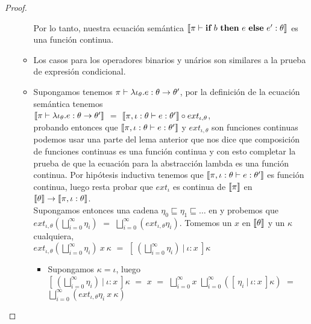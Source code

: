 \begin{proof}
\begin{itemize}
\begin{itemize}
Por lo tanto, nuestra ecuaci\'on sem\'antica $\llbracket \pi \vdash \textbf{if} \ b \ \textbf{then} \ e \ \textbf{else} \ e' : \theta \rrbracket$ es
una funci\'on continua.

\item Los casos para los operadores binarios y un\'arios son similares a la prueba
de expresi\'on condicional.

\item Supongamos tenemos $\pi \vdash \lambda \iota_{\theta} . e : \theta \rightarrow \theta'$, 
por la definici\'on de la ecuaci\'on sem\'antica tenemos \\

$\llbracket \pi \vdash \lambda \iota_{\theta} . e : \theta \rightarrow \theta' \rrbracket$ $=$
$\llbracket \pi,\iota:\theta \vdash e : \theta' \rrbracket \circ ext_{\iota,\theta}$, \\

probando entonces
que $\llbracket \pi,\iota:\theta \vdash e : \theta' \rrbracket$ y $ext_{\iota,\theta}$ son funciones 
continuas podemos usar una parte del lema anterior que nos dice que composici\'on
de funciones continuas es una funci\'on continua y con esto completar la prueba de que
la ecuaci\'on para la abstracci\'on lambda es una funci\'on continua. Por hip\'otesis
inductiva tenemos que $\llbracket \pi,\iota:\theta \vdash e : \theta' \rrbracket$ es funci\'on
continua, luego resta probar que $ext_\iota$ es continua de $\llbracket \pi \rrbracket$ en 
$\llbracket \theta \rrbracket \rightarrow \llbracket \pi,\iota:\theta \rrbracket$.\\

Supongamos entonces una cadena $\eta_0 \sqsubseteq \eta_1 \sqsubseteq \ldots$ en 
y probemos que $ext_{\iota,\theta} (\bigsqcup\limits^{\infty}_{i=0} \eta_i)$ $=$
$\bigsqcup\limits^{\infty}_{i=0} (ext_{\iota,\theta} \eta_i)$. Tomemos un $x$ en $\llbracket \theta \rrbracket$
y un $\kappa$ cualquiera,\\

$ext_{\iota,\theta} (\bigsqcup\limits^{\infty}_{i=0} \eta_i) \ x \ \kappa$ $=$
$[ \ (\bigsqcup\limits^{\infty}_{i=0} \eta_i) \ | \ \iota:x \ ] \kappa$

\begin{itemize}
\item Supongamos $\kappa = \iota$, luego \\

$[ \ (\bigsqcup\limits^{\infty}_{i=0} \eta_i) \ | \ \iota:x \ ] \kappa$ $=$
$x$ $=$ $\bigsqcup\limits^{\infty}_{i=0} x$ $\bigsqcup\limits^{\infty}_{i=0} 
([ \ \eta_i \ | \ \iota:x \ ] \kappa)$ $=$ $\bigsqcup\limits^{\infty}_{i=0} 
(ext_{\iota,\theta} \eta_i \ x \ \kappa)$\\


\end{itemize}
\end{itemize}
\end{itemize}
\end{proof}
